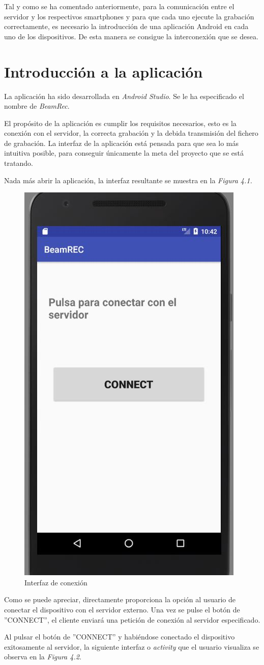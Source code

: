 \documentclass[a4paper,11pt]{book}
\begin{document}
Tal y como se ha comentado anteriormente, para la comunicación entre el servidor y los respectivos smartphones y para que cada uno ejecute la grabación correctamente, es necesario la introducción de una aplicación Android en cada uno de los dispositivos. De esta manera se consigue la interconexión que se desea.

	\section{Introducción a la aplicación}
	La aplicación ha sido desarrollada en \textit{Android Studio}. Se le ha especificado el nombre de \textit{BeamRec}.
	
	El propósito de la aplicación es cumplir los requisitos necesarios, esto es la conexión con el servidor, la correcta grabación y la debida transmisión del fichero de grabación. La interfaz de la aplicación está pensada para que sea lo más intuitiva posible, para conseguir únicamente la meta del proyecto que se está tratando.
	
	Nada más abrir la aplicación, la interfaz resultante se muestra en la \textit{Figura 4.1.}
	\begin{figure}[hbtp]
	\centering
	\includegraphics[width = 5 cm]{FIGURAS/interfaz1.JPG}
	\caption{Interfaz de conexión}
	\end{figure}
Como se puede apreciar, directamente proporciona la opción al usuario de conectar el dispositivo con el servidor externo. Una vez se pulse el botón de ''CONNECT'', el cliente enviará una petición de conexión al servidor especificado.
	
	Al pulsar el botón de ''CONNECT'' y habiéndose conectado el dispositivo exitosamente al servidor, la siguiente interfaz o \textit{activity} que el usuario visualiza se observa en la \textit{Figura 4.2}.
\end{document}
